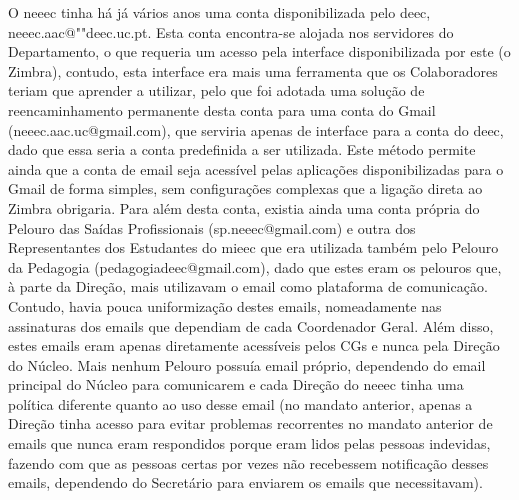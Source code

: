 O \acrshort{neeec} tinha há já vários anos uma conta disponibilizada pelo \acrshort{deec}, neeec.aac@""deec.uc.pt. Esta conta encontra-se alojada nos servidores do Departamento, o que requeria um acesso pela interface disponibilizada por este (o Zimbra), contudo, esta interface era mais uma ferramenta que os Colaboradores teriam que aprender a utilizar, pelo que foi adotada uma solução de reencaminhamento permanente desta conta para uma conta do Gmail (neeec.aac.uc@gmail.com), que serviria apenas de interface para a conta do \acrshort{deec}, dado que essa seria a conta predefinida a ser utilizada. Este método permite ainda que a conta de email seja acessível pelas aplicações disponibilizadas para o Gmail de forma simples, sem configurações complexas que a ligação direta ao Zimbra obrigaria. Para além desta conta, existia ainda uma conta própria do Pelouro das Saídas Profissionais (sp.neeec@gmail.com) e outra dos Representantes dos Estudantes do \acrshort{mieec} que era utilizada também pelo Pelouro da Pedagogia (pedagogiadeec@gmail.com), dado que estes eram os pelouros que, à parte da Direção, mais utilizavam o email como plataforma de comunicação. Contudo, havia pouca uniformização destes emails, nomeadamente nas assinaturas dos emails que dependiam de cada Coordenador Geral. Além disso, estes emails eram apenas diretamente acessíveis pelos CGs e nunca pela Direção do Núcleo. Mais nenhum Pelouro possuía email próprio, dependendo do email principal do Núcleo para comunicarem e cada Direção do \acrshort{neeec} tinha uma política diferente quanto ao uso desse email (no mandato anterior, apenas a Direção tinha acesso para evitar problemas recorrentes no mandato anterior de emails que nunca eram respondidos porque eram lidos pelas pessoas indevidas, fazendo com que as pessoas certas por vezes não recebessem notificação desses emails, dependendo do Secretário para enviarem os emails que necessitavam).

